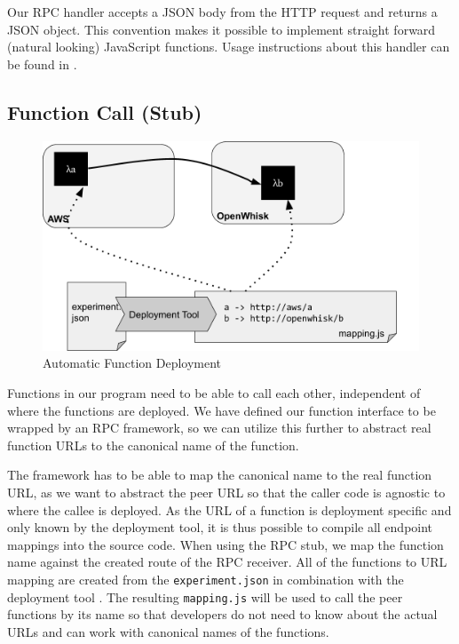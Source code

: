 \documentclass[../main.tex]{subfiles}
\begin{document}
Our RPC handler accepts a JSON body from the HTTP request and returns a JSON object. 
This convention makes it possible to implement straight forward (natural looking) JavaScript functions. 
Usage instructions about this handler can be found in .

\subsection{Function Call (Stub)}%
\label{sub:designFunctionCalls}

\begin{figure}
\begin{center}
  \includegraphics[width=\linewidth,keepaspectratio]{./deployment-tool.png}
\end{center}
\caption{Automatic Function Deployment}%
\label{fig:functionDeployment}
\end{figure}

Functions in our program need to be able to call each other, independent of where the functions are deployed. 
We have defined our function interface to be wrapped by an RPC framework, 
so we can utilize this further to abstract real function URLs to the canonical name of the function. 

The framework has to be able to map the canonical name to the real function URL, 
as we want to abstract the peer URL so that the caller code is agnostic to where the callee is deployed. 
As the URL of a function is deployment specific and only known by the deployment tool, 
it is thus possible to compile all endpoint mappings into the source code. 
When using the RPC stub, we map the function name against the created route of the RPC receiver. 
All of the functions to URL mapping are created from the \texttt{experiment.json} in combination with the deployment tool%
. 
The resulting \texttt{mapping.js} will be used to call the peer functions by its name so that developers
do not need to know about the actual URLs and can work with canonical names of the functions.
\end{document}
